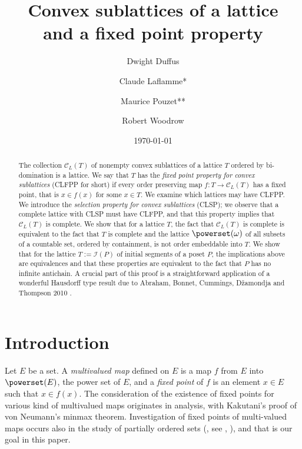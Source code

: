 \documentclass[12pt]{amsart}
\title[Convex sublattices and fixed point property]{Convex sublattices of a  lattice \\ and a fixed point property }
\author[D.Duffus]{Dwight Duffus}
\author[C.Laflamme]{Claude Laflamme*}
\author[M.Pouzet]{Maurice Pouzet**} \address{ICJ, Math\'ematiques, Universit\'e Claude-Bernard Lyon1, 43 bd. 11 Novembre 1918, 69622 Villeurbanne Cedex, France and Mathematics \& Statistics Department, University of Calgary, Calgary, Alberta, Canada T2N 1N4}
\author[R.Woodrow]{Robert Woodrow} \address{Mathematics \& Statistics Department, University of Calgary, Calgary, Alberta, Canada T2N 1N4}
\date{\today }
\begin{document}

\begin{abstract}  
The collection $\mathcal{C}_{L}(T)$ of nonempty convex sublattices of
a lattice $T$ ordered by bi-domination is a lattice. We say that $T$ has
the \emph{fixed point property for convex sublattices} (CLFPP for
short) if every order preserving map $f:T\rightarrow
\mathcal{C}_{L}(T)$ has a fixed point, that is $x\in f(x)$ for some
$x\in T$. We examine which lattices may have CLFPP.  We introduce the
\emph{selection property for convex sublattices} (CLSP); we observe
that a complete lattice with CLSP must have CLFPP, and that this
property implies that $\mathcal{C}_{L}(T)$ is complete.  We show that
for a lattice $T$, the fact that $\mathcal{C}_{ L}(T)$ is complete is
equivalent to the fact that $T$ is complete and the lattice $\powerset
(\omega)$ of all subsets of a countable set, ordered by containment,
is not order embeddable into $T$. We show that for the lattice
$T:=\mathcal {I}(P)$ of initial segments of a poset $P$, the
implications above are equivalences and that these properties are
equivalent to the fact that $P$ has no infinite antichain. A crucial
part of this proof is a straightforward application of a wonderful
Hausdorff type result due to Abraham, Bonnet, Cummings, D\v{z}amondja
and Thompson 2010 \cite{abraham-all}.
\end{abstract} 
\maketitle

\section{Introduction} 

Let $E$ be a set. A \emph{multivalued map} defined on $E$ is a map $f$
from $E$ into ${ \powerset(E) }$, the power set of $E$, and a \emph{fixed
point} of $f$ is an element $x \in E$ such that $x \in f(x)$. The
consideration of the existence of fixed points for various kind of
multivalued maps originates in analysis, with Kakutani's proof of von
Neumann's minmax theorem.  Investigation of fixed points of
multi-valued maps occurs also in the study of partially ordered sets
(\cite{smithson}, see \cite{R}, \cite{walker}), and that is our goal
in this paper.
 
\end{document}
